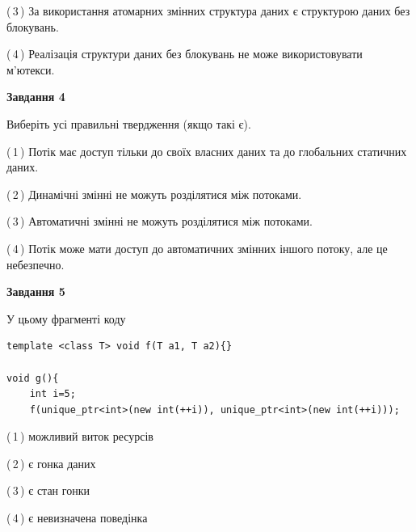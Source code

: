 \documentclass[12pt, ukrainian]{article}
\begin{document}
\begin {large}
{(\,3\,) За використання атомарних змінних структура даних є структурою даних без блокувань.%

(\,4\,) Реалізація структури даних без блокувань не може використовувати м’ютекси.%



\begin{center}
\textbf{Завдання 4}
\end{center}
Виберіть усі правильні твердження (якщо такі є).\par
\vspace{2mm}

(\,1\,) Потік має доступ тільки до своїх власних даних та до глобальних статичних даних.%

(\,2\,) Динамічні змінні не можуть розділятися між потоками.%

(\,3\,) Автоматичні змінні не можуть розділятися між потоками.%

(\,4\,) Потік може мати доступ до автоматичних змінних іншого потоку, але це небезпечно.%



\begin{center}
\textbf{Завдання 5}
\end{center}
У цьому фрагменті коду
\begin{verbatim}
template <class T> void f(T a1, T a2){}

void g(){
    int i=5;
    f(unique_ptr<int>(new int(++i)), unique_ptr<int>(new int(++i)));
\end{verbatim}

(\,1\,) можливий виток ресурсів%

(\,2\,) є гонка даних%

(\,3\,) є стан гонки%

(\,4\,) є невизначена поведінка%


}
\end {large}
\end{document}
